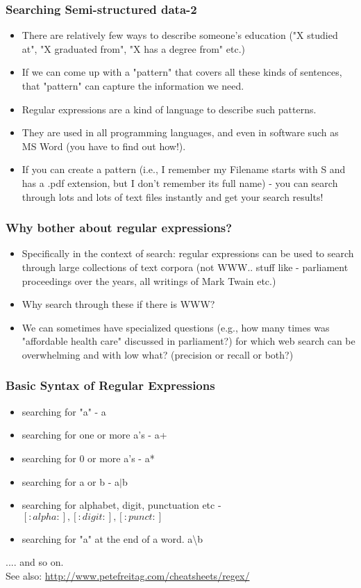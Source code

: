 \documentclass{beamer}
\begin{document}
\begin{frame}
\frametitle{Searching Semi-structured data-2}
\begin{itemize}
\item There are relatively few ways to describe someone's education ("X studied at", "X graduated from", "X has a degree from" etc.) 
\item If we can come up with a "pattern" that covers all these kinds of sentences, that "pattern" can capture the information we need. \pause
\item Regular expressions are a kind of language to describe such patterns.
\item They are used in all programming languages, and even in software such as MS Word (you have to find out how!). %
\item If you can create a pattern (i.e., I remember my Filename starts with S and has a .pdf extension, but I don't remember its full name) - you can search through lots and lots of text files instantly and get your search results!
\end{itemize}
\end{frame}

\begin{frame}
\frametitle{Why bother about regular expressions?}
\begin{itemize}
\item Specifically in the context of search: regular expressions can be used to search through large collections of text corpora (not WWW.. stuff like - parliament proceedings over the years, all writings of Mark Twain etc.)
\item Why search through these if there is WWW? \pause
\item We can sometimes have specialized questions (e.g., how many times was "affordable health care" discussed in parliament?) for which web search can be overwhelming and with low what? (precision or recall or both?) \pause
\end{itemize}
\end{frame}

\begin{frame}
\frametitle{Basic Syntax of Regular Expressions}
\begin{itemize}
\item searching for "a" - a
\item searching for one or more a's - a+
\item searching for 0 or more a's - a*
\item searching for a or b - a$|$b
\item searching for alphabet, digit, punctuation etc - $[:alpha:], [:digit:], [:punct:]$
\item searching for "a" at the end of a word. a\textbackslash b
\end{itemize}
.... and so on. \\
See also: \url{http://www.petefreitag.com/cheatsheets/regex/}
\end{frame}
\end{document}
